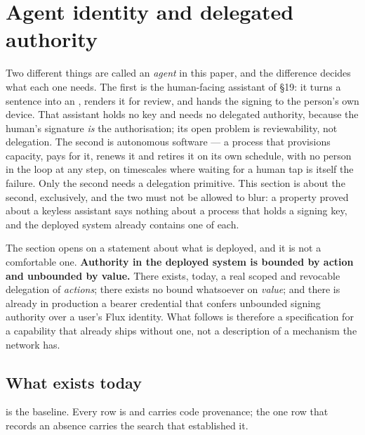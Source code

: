 \section{Agent identity and delegated authority}
\label{sec:agent-identity}

Two different things are called an \emph{agent} in this paper, and the difference decides what each
one needs. The first is the human-facing assistant of \S19: it turns a sentence into an \appspec,
renders it for review, and hands the signing to the person's own device. That assistant holds no key
and needs no delegated authority, because the human's signature \emph{is} the authorisation; its open
problem is reviewability, not delegation. The second is autonomous software — a process that
provisions capacity, pays for it, renews it and retires it on its own schedule, with no person in the
loop at any step, on timescales where waiting for a human tap is itself the failure. Only the second
needs a delegation primitive. This section is about the second, exclusively, and the two must not be
allowed to blur: a property proved about a keyless assistant says nothing about a process that holds
a signing key, and the deployed system already contains one of each.

The section opens on a statement about what is deployed, and it is not a comfortable one.
\textbf{Authority in the deployed system is bounded by action and unbounded by value.} There exists,
today, a real scoped and revocable delegation of \emph{actions}; there exists no bound whatsoever on
\emph{value}; and there is already in production a bearer credential that confers unbounded signing
authority over a user's Flux identity. What follows is therefore a specification for a capability
that already ships without one, not a description of a mechanism the network has.

\subsection{What exists today}
\label{sec:agent-identity:today}

 is the baseline. Every row is \shipped and carries code provenance; the one
row that records an absence carries the search that established it.

